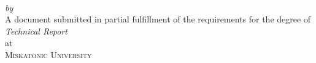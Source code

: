 \begin{titlepage}
  \vspace*{5cm}
  \makeatletter
  \begin{center}
    \begin{Huge}
      \@title
    \end{Huge}\\[0.1cm]
    \emph{by}\\
    \@author
    \vfill
    A document submitted in partial fulfillment
    of the requirements for the degree of\\
    \emph{Technical Report}\\
    at\\
    \textsc{Miskatonic University}
  \end{center}
  \makeatother
\end{titlepage}

\newpage
\null
\thispagestyle{empty}
\newpage
